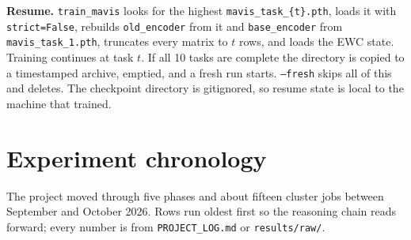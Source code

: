 \documentclass[11pt,a4paper]{article}
\newcommand{\code}[1]{\texttt{#1}}
\begin{document}
\textbf{Resume.} \code{train\_mavis} looks for the highest \code{mavis\_task\_\{t\}.pth}, loads it with \code{strict=False}, rebuilds \code{old\_encoder} from it and \code{base\_encoder} from \code{mavis\_task\_1.pth}, truncates every matrix to $t$ rows, and loads the EWC state. Training continues at task $t$. If all 10 tasks are complete the directory is copied to a timestamped archive, emptied, and a fresh run starts. \code{--fresh} skips all of this and deletes. The checkpoint directory is gitignored, so resume state is local to the machine that trained.

\section{Experiment chronology}

The project moved through five phases and about fifteen cluster jobs between September and October 2026. Rows run oldest first so the reasoning chain reads forward; every number is from \code{PROJECT\_LOG.md} or \code{results/raw/}.
\end{document}
